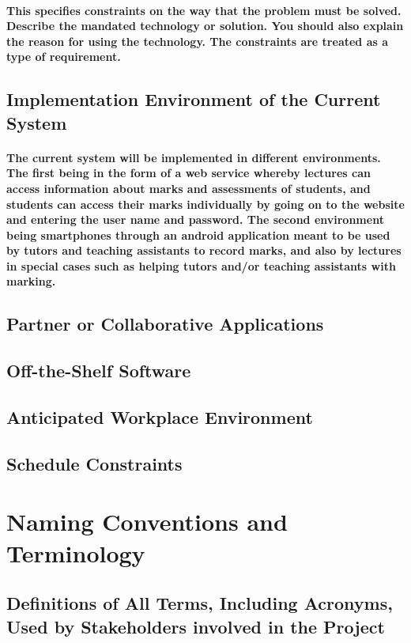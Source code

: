 \documentclass[12pt,a4paper]{article}
\begin{document}
\paragraph{
This specifies constraints on the way that the problem must be solved. Describe the mandated technology or solution. You should also explain the reason for using the technology. The constraints are treated as a type of requirement.}
\subsection{Implementation Environment of the Current System}
\paragraph{The current system will be implemented in different environments. The first being in the form of a web service whereby lectures can access information about marks and assessments of students, and students can access their marks individually by going on to the website and entering the user name and password.
The second environment being smartphones through an android application meant to be used by tutors and teaching assistants to record marks, and also by lectures in special cases such as helping tutors and/or teaching assistants with marking.}
\subsection{Partner or Collaborative Applications}
\subsection{Off-the-Shelf Software}
\subsection{Anticipated Workplace Environment}
\subsection{Schedule Constraints}
\pagebreak
\section{Naming Conventions and Terminology}
\subsection{Definitions of All Terms, Including Acronyms, Used by Stakeholders involved in the Project}
\pagebreak
\end{document}

